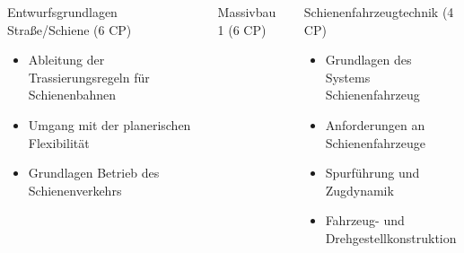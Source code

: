 \documentclass[slidestop,compress,mathserif, aspectratio = 169, 9pt]{beamer}
\begin{document}
{ \begin{columns}[t] 
     \begin{column}[T]{4.5cm} 
     Entwurfsgrundlagen Stra{\ss}e/Schiene (6 CP)
     	\begin{itemize}
	\item Ableitung der Trassierungsregeln für Schienenbahnen%
	\item Umgang mit der planerischen Flexibilität
	\item Grundlagen Betrieb des Schienenverkehrs%
     	\end{itemize}
     \end{column}
     	\begin{column}[T]{4.5cm} 
	Massivbau 1 (6 CP)
     \end{column}
     \begin{column}[T]{4.5cm} 
     Schienenfahrzeugtechnik (4 CP)
\begin{itemize}
     	\item Grundlagen des Systems Schienenfahrzeug
	\item Anforderungen an Schienenfahrzeuge
	\item Spurführung und Zugdynamik
	\item Fahrzeug- und Drehgestellkonstruktion
	\end{itemize}
     \end{column}
 \end{columns}

}

\end{document}
